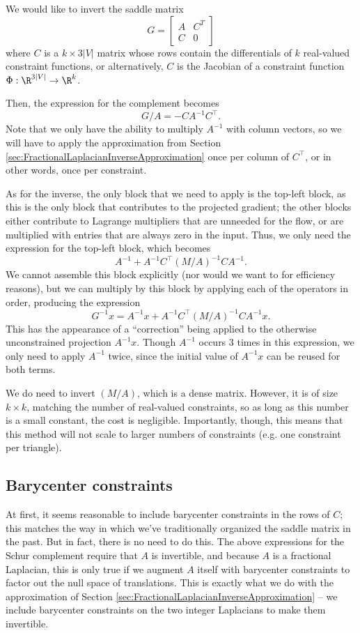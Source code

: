 \documentclass[11pt]{article}
\begin{document}
We would like to invert the saddle matrix
$$G = 
\left[
\begin{array}{cc}
A & C^T \\
C & 0
\end{array}
\right]
$$
where $C$ is a $k \times 3|V|$ matrix whose rows contain the differentials of $k$ real-valued constraint functions, or alternatively, $C$ is the Jacobian of a constraint function $\Phi : \R^{3|V|} \to \R^k$.

Then, the expression for the complement becomes $$G / A = -C A^{-1} C^{\top}.$$ Note that we only have the ability to multiply $A^{-1}$ with column vectors, so we will have to apply the approximation from Section \ref{sec:FractionalLaplacianInverseApproximation} once per column of $C^{\top}$, or in other words, once per constraint.

As for the inverse, the only block that we need to apply is the top-left block, as this is the only block that contributes to the projected gradient; the other blocks either contribute to Lagrange multipliers that are unneeded for the flow, or are multiplied with entries that are always zero in the input. Thus, we only need the expression for the top-left block, which becomes $$A^{-1} + A^{-1} C^{\top} (M/A)^{-1} C A^{-1}.$$ We cannot assemble this block explicitly (nor would we want to for efficiency reasons), but we can multiply by this block by applying each of the operators in order, producing the expression $$G^{-1} x = A^{-1} x + A^{-1} C^{\top} (M / A)^{-1} C A^{-1} x.$$ This has the appearance of a ``correction'' being applied to the otherwise unconstrained projection $A^{-1} x$. Though $A^{-1}$ occurs 3 times in this expression, we only need to apply $A^{-1}$ twice, since the initial value of $A^{-1}x$ can be reused for both terms.

We do need to invert $(M/A)$, which is a dense matrix. However, it is of size $k \times k$, matching the number of real-valued constraints, so as long as this number is a small constant, the cost is negligible. Importantly, though, this means that this method will not scale to larger numbers of constraints (e.g. one constraint per triangle).

\subsection{Barycenter constraints}

At first, it seems reasonable to include barycenter constraints in the rows of $C$; this matches the way in which we've traditionally organized the saddle matrix in the past. But in fact, there is no need to do this. The above expressions for the Schur complement require that $A$ is invertible, and because $A$ is a fractional Laplacian, this is only true if we augment $A$ itself with barycenter constraints to factor out the null space of translations. This is exactly what we do with the approximation of Section \ref{sec:FractionalLaplacianInverseApproximation} -- we include barycenter constraints on the two integer Laplacians to make them invertible.
\end{document}
